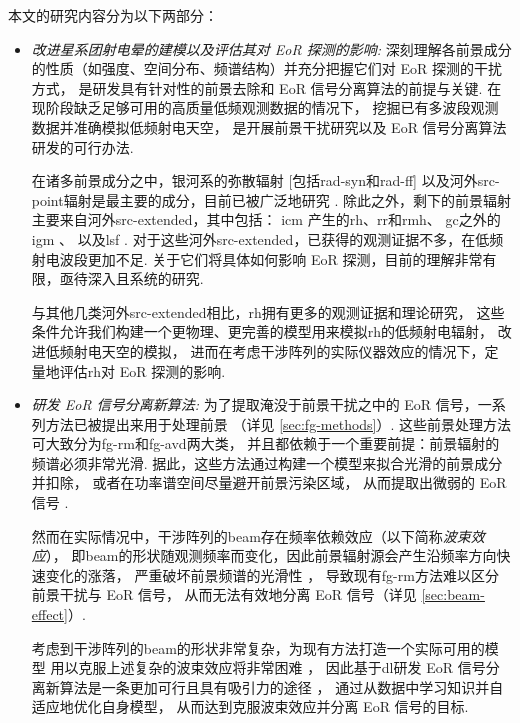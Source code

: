 本文的研究内容分为以下两部分：
\begin{itemize}
\item
\emph{改进星系团射电晕的建模以及评估其对 EoR 探测的影响:}
深刻理解各前景成分的性质（如强度、空间分布、频谱结构）并充分把握它们对 EoR 探测的干扰方式，
是研发具有针对性的前景去除和 EoR 信号分离算法的前提与关键.
在现阶段缺乏足够可用的高质量低频观测数据的情况下，
挖掘已有多波段观测数据并准确模拟低频射电天空，
是开展前景干扰研究以及 EoR 信号分离算法研发的可行办法.

\hspace{2\ccwd}%
在诸多前景成分之中，银河系的弥散辐射 [包括\ac{rad-syn}和\ac{rad-ff}]
以及河外\ac{src-point}辐射是最主要的成分，目前已被广泛地研究
\cite{shaver1999,diMatteo2004,gleser2008,liu2012,murray2017,spinelli2018}.
除此之外，剩下的前景辐射主要来自河外\ac{src-extended}，其中包括：
\ac{icm} \cite{feretti2012} 产生的\ac{rh}、\ac{rr}和\ac{rmh}、
\ac{gc}之外的\ac{igm} \cite{keshet2004}、
以及\ac{lsf} \cite{vazza2015}.
对于这些河外\ac{src-extended}，已获得的观测证据不多，在低频射电波段更加不足.
关于它们将具体如何影响 EoR 探测，目前的理解非常有限，亟待深入且系统的研究.

\hspace{2\ccwd}%
与其他几类河外\ac{src-extended}相比，\ac{rh}拥有更多的观测证据和理论研究，
这些条件允许我们构建一个更物理、更完善的模型用来模拟\ac{rh}的低频射电辐射，
改进低频射电天空的模拟，
进而在考虑干涉阵列的实际仪器效应的情况下，定量地评估\ac{rh}对 EoR 探测的影响.

\item
\emph{研发 EoR 信号分离新算法:}
为了提取淹没于前景干扰之中的 EoR 信号，一系列方法已被提出来用于处理前景
（详见 \autoref{sec:fg-methods}）.
这些前景处理方法可大致分为\ac{fg-rm}和\ac{fg-avd}两大类，
并且都依赖于一个重要前提：前景辐射的频谱必须非常光滑.
据此，这些方法通过构建一个模型来拟合光滑的前景成分并扣除，
或者在功率谱空间尽量避开前景污染区域，
从而提取出微弱的 EoR 信号 \cite{chapman2016}.

\hspace{2\ccwd}%
然而在实际情况中，干涉阵列的\ac{beam}存在频率依赖效应（以下简称\emph{波束效应}），
即\ac{beam}的形状随观测频率而变化，因此前景辐射源会产生沿频率方向快速变化的涨落，
严重破坏前景频谱的光滑性 \cite{liu2009ps}，
导致现有\ac{fg-rm}方法难以区分前景干扰与 EoR 信号，
从而无法有效地分离 EoR 信号（详见 \autoref{sec:beam-effect}）.

\hspace{2\ccwd}%
考虑到干涉阵列的\ac{beam}的形状非常复杂，为现有方法打造一个实际可用的模型
用以克服上述复杂的波束效应将非常困难 \cite{lochner2015}，
因此基于\ac{dl}研发 EoR 信号分离新算法是一条更加可行且具有吸引力的途径
\cite{herbel2018,vafaeiSadr2019}，
通过从数据中学习知识并自适应地优化自身模型，
从而达到克服波束效应并分离 EoR 信号的目标.

\end{itemize}

